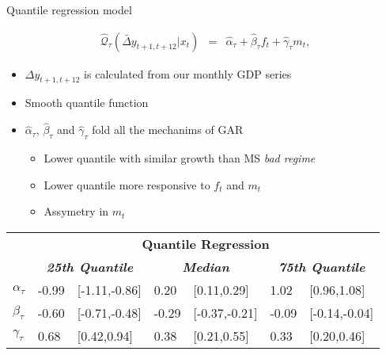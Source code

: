 \documentclass[xcolor=dvipsnames, xcolor=table, 10pt]{beamer}
\newcommand*{\h}{\hspace{0.15cm}}
\begin{document}
\begin{frame}{Quantile regression model}

\begin{eqnarray*}
\widehat{\mathcal{Q}}_{\tau}(\bar{\Delta} {y}_{t+1,t+12}|x_t) &=& \hat{\alpha}_{\tau} + \hat{\beta}_{\tau} f_t + \hat{\gamma}_{\tau} m_t, \label{eq:GAR}
\end{eqnarray*}

\begin{itemize}
\item $\Delta {y}_{t+1,t+12}$ is calculated from our monthly GDP series
\medskip
\item Smooth quantile function \citep{AzzaliniCapitanio2003}
\medskip
\item $\hat{\alpha}_\tau$, $\hat{\beta}_\tau$ and $\hat{\gamma}_\tau$ fold all the mechanims of GAR
  \begin{itemize}
    \medskip
     \item Lower quantile with similar growth than MS \textit{bad regime}
       \medskip
     \item Lower quantile more responsive to $f_t$ and $m_t$
       \medskip
       \item Assymetry in $m_t$
  \end{itemize}
\end{itemize}

\vspace*{-0.25cm}
\small
\begin{table}[ht!]
  \centering
  \begin{threeparttable}
    \begin{tabular}{p{0.5cm} p{} p{1.8cm} p{} p{1.8cm} p{} p{1.8cm} }
      \midrule
      & \multicolumn{6}{c}{\textbf{Quantile Regression}} \\
          \cline{2-7}
     & \multicolumn{2}{c}{\textbf{\textit{25th Quantile}}} & \multicolumn{2}{c}{\textbf{\textit{Median}}} & \multicolumn{2}{c}{\textbf{\textit{75th Quantile}}} \\
     \midrule
     $\alpha_{\tau}$ & -0.99  & [-1.11,-0.86] & \h0.20  & [\h0.11,\h0.29] &  \h1.02 & [\h0.96,\h1.08]\\
$\beta_{\tau}$  & -0.60  & [-0.71,-0.48]  & -0.29  & [-0.37,-0.21] & -0.09 & [-0.14,-0.04] \\
$\gamma_{\tau}$  & \h0.68  & [\h0.42,\h0.94] & \h0.38  & [\h0.21,\h0.55] &  \h0.33 & [\h0.20,\h0.46] \\
    \midrule
    \midrule
    \end{tabular}%
    \end{threeparttable}
  \label{tab:MS_QR_coeff}%
\end{table}%
\normalsize

\end{frame}
\end{document}
